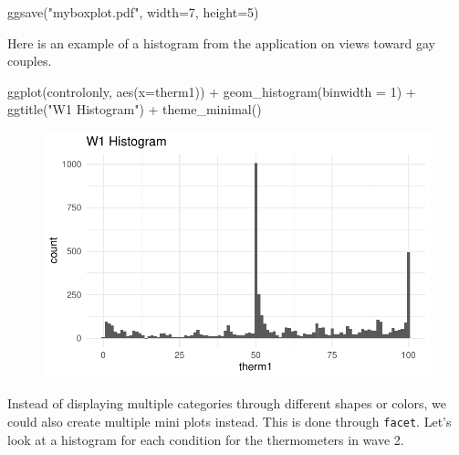 \documentclass[
  letterpaper,
  DIV=11,
  numbers=noendperiod]{scrreprt}
\newenvironment{Shaded}{\begin{snugshade}}{\end{snugshade}}
\newcommand{\AttributeTok}[1]{\textcolor[rgb]{0.40,0.45,0.13}{#1}}
\newcommand{\DecValTok}[1]{\textcolor[rgb]{0.68,0.00,0.00}{#1}}
\newcommand{\FunctionTok}[1]{\textcolor[rgb]{0.28,0.35,0.67}{#1}}
\newcommand{\NormalTok}[1]{\textcolor[rgb]{0.00,0.23,0.31}{#1}}
\newcommand{\SpecialCharTok}[1]{\textcolor[rgb]{0.37,0.37,0.37}{#1}}
\newcommand{\StringTok}[1]{\textcolor[rgb]{0.13,0.47,0.30}{#1}}
\begin{document}
\begin{Shaded}
\begin{Highlighting}[]
\FunctionTok{ggsave}\NormalTok{(}\StringTok{"myboxplot.pdf"}\NormalTok{, }\AttributeTok{width=}\DecValTok{7}\NormalTok{, }\AttributeTok{height=}\DecValTok{5}\NormalTok{)}
\end{Highlighting}
\end{Shaded}

Here is an example of a histogram from the application on views toward
gay couples.

\begin{Shaded}
\begin{Highlighting}[]
\FunctionTok{ggplot}\NormalTok{(controlonly, }\FunctionTok{aes}\NormalTok{(}\AttributeTok{x=}\NormalTok{therm1)) }\SpecialCharTok{+}
  \FunctionTok{geom\_histogram}\NormalTok{(}\AttributeTok{binwidth =} \DecValTok{1}\NormalTok{) }\SpecialCharTok{+}
  \FunctionTok{ggtitle}\NormalTok{(}\StringTok{"W1 Histogram"}\NormalTok{) }\SpecialCharTok{+}
  \FunctionTok{theme\_minimal}\NormalTok{()}
\end{Highlighting}
\end{Shaded}

\begin{figure}[H]

{\centering \includegraphics{04-Visualization_files/figure-pdf/unnamed-chunk-48-1.pdf}

}

\end{figure}

Instead of displaying multiple categories through different shapes or
colors, we could also create multiple mini plots instead. This is done
through \texttt{facet}. Let's look at a histogram for each condition for
the thermometers in wave 2.
\end{document}
